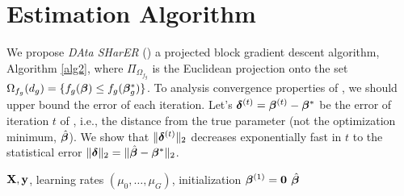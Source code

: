 \section{Estimation Algorithm}
\label{sec:opt}
We propose \emph{DAta SHarER} (\dc) a projected block gradient descent algorithm, Algorithm \ref{alg2}, where $\Pi_{\Omega_{f_g}}$ is the Euclidean projection onto the set $\Omega_{f_g}(d_g) = \{f_g(\boldsymbol{\beta}) \leq f_g(\boldsymbol{\beta}_g^*)\}$.%
To analysis convergence properties of \dc, we should upper bound the error of each iteration.%
Let's $\boldsymbol{\delta}^{(t)} = \boldsymbol{\beta}^{(t)} - \boldsymbol{\beta}^*$ be the error of  iteration $t$ of \dc, i.e., the distance from the true parameter (not the optimization minimum, $\hat{\boldsymbol{\beta}}$).
We show that $\|\boldsymbol{\delta}^{(t)}\|_{2}$ decreases exponentially fast in $t$ to the statistical error $\|\boldsymbol{\delta}\|_{2} = \|\hat{\boldsymbol{\beta}} - \boldsymbol{\beta}^*\|_{2}$.
\begin{algorithm}[t]
	\caption{  \dc }
	\label{alg2}
	\begin{algorithmic}[1]
		 $\mathbf{X}, \mathbf{y}$, learning rates $(\mu_0, \dots, \mu_G)$, initialization $\boldsymbol{\beta} ^{(1)} = \mathbf{0}$
		 $\hat{\boldsymbol{\beta}}$
		\ENDFOR
		\ENDFOR
	\end{algorithmic}
\end{algorithm}

